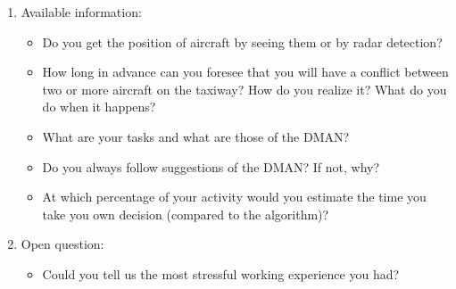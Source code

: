\documentclass{article}
\begin{document}
\begin{enumerate}
    \item Available information:
        \begin{itemize}
            \item Do you get the position of aircraft by seeing them or by radar detection?
            \item How long in advance can you foresee that you will have a conflict between two or more aircraft on the taxiway? How do you realize it? What do you do when it happens?
            \item What are your tasks and what are those of the DMAN? 
            \item Do you always follow suggestions of the DMAN? If not, why?
            \item At which percentage of your activity would you estimate the time you take you own decision (compared to the algorithm)? 
        \end{itemize}
    \item Open question:
    \begin{itemize}
        \item Could you tell us the most stressful working experience you had?
    \end{itemize}
    
\end{enumerate}
\end{document}
